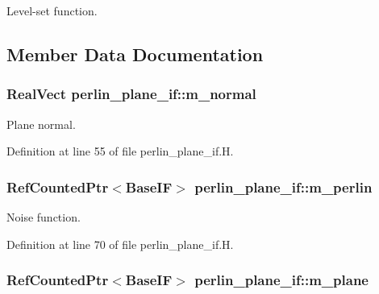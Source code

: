 Level-\/set function. 



\subsection{Member Data Documentation}
\subsubsection[{\texorpdfstring{m\+\_\+normal}{m_normal}}]{\setlength{\rightskip}{0pt plus 5cm}Real\+Vect perlin\+\_\+plane\+\_\+if\+::m\+\_\+normal\hspace{0.3cm}{\ttfamily [protected]}}\hypertarget{classperlin__plane__if_a35d283c8c3cb07e7b78788d234745ebe}{}\label{classperlin__plane__if_a35d283c8c3cb07e7b78788d234745ebe}


Plane normal. 



Definition at line 55 of file perlin\+\_\+plane\+\_\+if.\+H.

\subsubsection[{\texorpdfstring{m\+\_\+perlin}{m_perlin}}]{\setlength{\rightskip}{0pt plus 5cm}Ref\+Counted\+Ptr$<$Base\+IF$>$ perlin\+\_\+plane\+\_\+if\+::m\+\_\+perlin\hspace{0.3cm}{\ttfamily [protected]}}\hypertarget{classperlin__plane__if_af9c92f660c0be22a146e0dd6da16ae82}{}\label{classperlin__plane__if_af9c92f660c0be22a146e0dd6da16ae82}


Noise function. 



Definition at line 70 of file perlin\+\_\+plane\+\_\+if.\+H.

\subsubsection[{\texorpdfstring{m\+\_\+plane}{m_plane}}]{\setlength{\rightskip}{0pt plus 5cm}Ref\+Counted\+Ptr$<$Base\+IF$>$ perlin\+\_\+plane\+\_\+if\+::m\+\_\+plane\hspace{0.3cm}{\ttfamily [protected]}}\hypertarget{classperlin__plane__if_acf956bcf505763e786323ca39b9810b8}{}\label{classperlin__plane__if_acf956bcf505763e786323ca39b9810b8}


